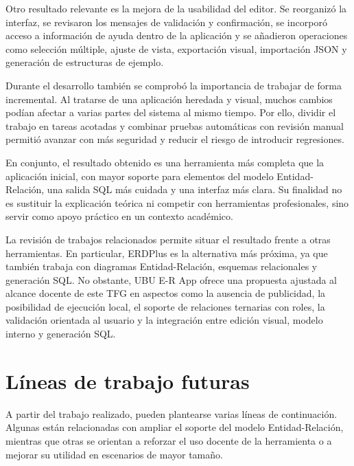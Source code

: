 Otro resultado relevante es la mejora de la usabilidad del editor. Se reorganizó la interfaz, se revisaron los mensajes de validación y confirmación, se incorporó acceso a información de ayuda dentro de la aplicación y se añadieron operaciones como selección múltiple, ajuste de vista, exportación visual, importación JSON y generación de estructuras de ejemplo.

Durante el desarrollo también se comprobó la importancia de trabajar de forma incremental. Al tratarse de una aplicación heredada y visual, muchos cambios podían afectar a varias partes del sistema al mismo tiempo. Por ello, dividir el trabajo en tareas acotadas y combinar pruebas automáticas con revisión manual permitió avanzar con más seguridad y reducir el riesgo de introducir regresiones.

En conjunto, el resultado obtenido es una herramienta más completa que la aplicación inicial, con mayor soporte para elementos del modelo Entidad-Relación, una salida SQL más cuidada y una interfaz más clara. Su finalidad no es sustituir la explicación teórica ni competir con herramientas profesionales, sino servir como apoyo práctico en un contexto académico.

La revisión de trabajos relacionados permite situar el resultado frente a otras herramientas. En particular, ERDPlus es la alternativa más próxima, ya que también trabaja con diagramas Entidad-Relación, esquemas relacionales y generación SQL. No obstante, UBU E-R App ofrece una propuesta ajustada al alcance docente de este TFG en aspectos como la ausencia de publicidad, la posibilidad de ejecución local, el soporte de relaciones ternarias con roles, la validación orientada al usuario y la integración entre edición visual, modelo interno y generación SQL.

\section{Líneas de trabajo futuras}

A partir del trabajo realizado, pueden plantearse varias líneas de continuación. Algunas están relacionadas con ampliar el soporte del modelo Entidad-Relación, mientras que otras se orientan a reforzar el uso docente de la herramienta o a mejorar su utilidad en escenarios de mayor tamaño.

